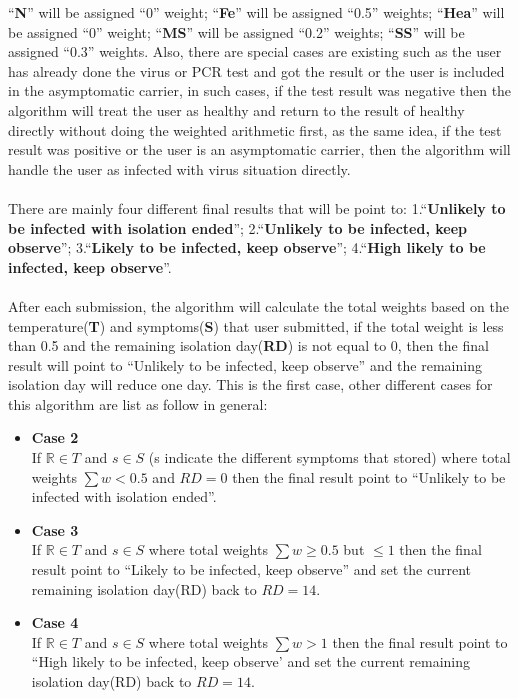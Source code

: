 \documentclass[12pt]{article}
\begin{document}
\begin{itemize}
``\textbf{N}'' will be assigned ``0'' weight; ``\textbf{Fe}'' will be assigned ``0.5'' weights;
``\textbf{Hea}'' will be assigned ``0'' weight; ``\textbf{MS}'' will be assigned ``0.2'' weights; ``\textbf{SS}'' will be assigned ``0.3'' weights. Also, there are special cases are existing such as the user has already done the virus or PCR test and got the result or the user is included in the asymptomatic carrier, in such cases, if the test result was negative then the algorithm will treat the user as healthy and return to the result of healthy directly without doing the weighted arithmetic first, as the same idea, if the test result was positive or the user is an asymptomatic carrier, then the algorithm will handle the user as infected with virus situation directly. 
\\
\\There are mainly four different final results that will be point to: 1.``\textbf{Unlikely to be infected with isolation ended}''; 2.``\textbf{Unlikely to be infected, keep observe}''; 3.``\textbf{Likely to be infected, keep observe}''; 4.``\textbf{High likely to be infected, keep observe}''.
\\
\\After each submission, the algorithm will calculate the total weights based on the temperature(\textbf{T}) and symptoms(\textbf{S}) that user submitted, if the total weight is less than 0.5 and the remaining isolation day(\textbf{RD}) is not equal to 0, then the final result will point to ``Unlikely to be infected, keep observe'' and the remaining isolation day will reduce one day. This is the first case, other different cases for this algorithm are list as follow in general:
\begin{itemize}
\item\textbf{Case 2}
\\If $\mathbb{R}\in T$ and $s \in S$ (s indicate the different symptoms that stored) where total weights $\sum w < 0.5 $ and $RD = 0$ then the final result point to ``Unlikely to be infected with isolation ended''.
\item\textbf{Case 3}
\\If $\mathbb{R}\in T$ and $s \in S$ where total weights $\sum w \geq 0.5$ but $\leq 1$ then the final result point to ``Likely to be infected, keep observe'' and set the current remaining isolation day(RD) back to $RD = 14$.
\item\textbf{Case 4}
\\If $\mathbb{R}\in T$ and $s \in S$ where total weights $\sum w > 1$ then the final result point to ``High likely to be infected, keep observe' and set the current remaining isolation day(RD) back to $RD = 14$.

\end{itemize}
\end{itemize}
\end{document}
